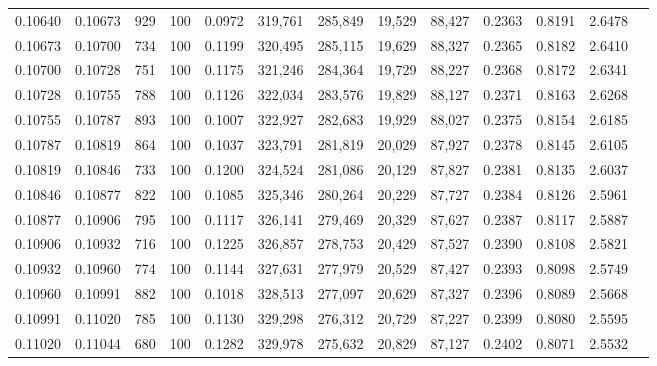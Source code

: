 \begin{tabular}{rrrrrrrrrrrrr}
0.10640 & 0.10673 &   929 & 100 &                                     0.0972 & 319,761 & 285,849 &  19,529 &  88,427 & 0.2363 & 0.8191 & 2.6478 \\
0.10673 & 0.10700 &   734 & 100 &                                     0.1199 & 320,495 & 285,115 &  19,629 &  88,327 & 0.2365 & 0.8182 & 2.6410 \\
0.10700 & 0.10728 &   751 & 100 &                                     0.1175 & 321,246 & 284,364 &  19,729 &  88,227 & 0.2368 & 0.8172 & 2.6341 \\
0.10728 & 0.10755 &   788 & 100 &                                     0.1126 & 322,034 & 283,576 &  19,829 &  88,127 & 0.2371 & 0.8163 & 2.6268 \\
0.10755 & 0.10787 &   893 & 100 &                                     0.1007 & 322,927 & 282,683 &  19,929 &  88,027 & 0.2375 & 0.8154 & 2.6185 \\
0.10787 & 0.10819 &   864 & 100 &                                     0.1037 & 323,791 & 281,819 &  20,029 &  87,927 & 0.2378 & 0.8145 & 2.6105 \\
0.10819 & 0.10846 &   733 & 100 &                                     0.1200 & 324,524 & 281,086 &  20,129 &  87,827 & 0.2381 & 0.8135 & 2.6037 \\
0.10846 & 0.10877 &   822 & 100 &                                     0.1085 & 325,346 & 280,264 &  20,229 &  87,727 & 0.2384 & 0.8126 & 2.5961 \\
0.10877 & 0.10906 &   795 & 100 &                                     0.1117 & 326,141 & 279,469 &  20,329 &  87,627 & 0.2387 & 0.8117 & 2.5887 \\
0.10906 & 0.10932 &   716 & 100 &                                     0.1225 & 326,857 & 278,753 &  20,429 &  87,527 & 0.2390 & 0.8108 & 2.5821 \\
0.10932 & 0.10960 &   774 & 100 &                                     0.1144 & 327,631 & 277,979 &  20,529 &  87,427 & 0.2393 & 0.8098 & 2.5749 \\
0.10960 & 0.10991 &   882 & 100 &                                     0.1018 & 328,513 & 277,097 &  20,629 &  87,327 & 0.2396 & 0.8089 & 2.5668 \\
0.10991 & 0.11020 &   785 & 100 &                                     0.1130 & 329,298 & 276,312 &  20,729 &  87,227 & 0.2399 & 0.8080 & 2.5595 \\
0.11020 & 0.11044 &   680 & 100 &                                     0.1282 & 329,978 & 275,632 &  20,829 &  87,127 & 0.2402 & 0.8071 & 2.5532 \\

\end{tabular}
